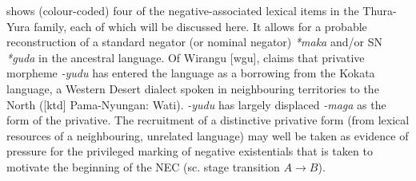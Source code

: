 \documentclass[output=paper]{langsci/langscibook}
\begin{document}
\begin{table}
\end{table}

 shows (colour-coded) four of the
    negative-associated lexical items in the Thura-Yura family, each of
    which will be discussed here. It allows for a probable reconstruction
    of a standard negator (or nominal negator) \textit{*maka} and\slash or
    SN \textit{*guda} in the ancestral language. Of Wirangu
    [wgu], \citet[57]{Hercus1999} claims that privative morpheme
    \textit{-yudu} has entered the language as a borrowing from the
    Kokata language, a Western Desert dialect spoken in neighbouring territories to the North ([ktd] Pama-Nyungan: Wati). \textit{-yudu} has largely displaced \textit{-maga} as the form of the privative. The recruitment of a distinctive privative form (from lexical resources of a neighbouring, unrelated language) may well be taken as evidence of pressure for the privileged marking of negative existentials that is taken to motivate the beginning of the NEC (sc. stage transition $A\to B$).
%
\end{document}
